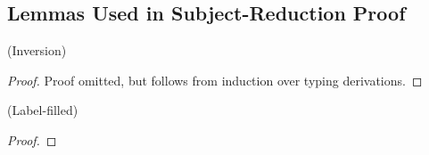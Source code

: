 \subsection{Lemmas Used in Subject-Reduction Proof}
\begin{lemma}{(Inversion)}
\end{lemma}
\begin{proof}
    Proof omitted, but follows from induction over typing derivations.
\end{proof}

\begin{lemma}{(Label-filled)}
\end{lemma}
\begin{proof}
\end{proof}

